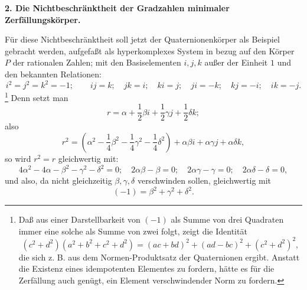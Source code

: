 
\begin{center}
\textbf{2. Die Nichtbeschränktheit der Gradzahlen minimaler\\
Zerfällungskörper.}
\end{center}

Für diese Nichtbeschränktheit soll jetzt der Quaternionenkörper als Beispiel gebracht werden, aufgefaßt als hyperkomplexes System in bezug auf den Körper $P$ der rationalen Zahlen; mit den Basiselementen $i,j,k$ außer der Einheit $1$ und den bekannten Relationen:
\[
 i^2=j^2=k^2=-1;\qquad ij=k;\quad jk=i;\quad ki=j;\quad ji=-k;\quad kj=-i;\quad ik=-j.
\]
\footnote{Daß aus einer Darstellbarkeit von $(-1)$ als Summe von drei Quadraten immer eine solche als Summe von zwei folgt, zeigt die Identität
\[
(c^2+d^2)(a^2+b^2+c^2+d^2)=(ac+bd)^2+(ad-bc)^2+(c^2+d^2)^2,
\]
die sich z. B. aus dem Normen-Produktsatz der Quaternionen ergibt. Anstatt die Existenz eines idempotenten Elementes zu fordern, hätte es für die Zerfällung auch genügt, ein Element verschwindender Norm zu fordern.} Denn setzt man
\[
        r=\alpha+\frac12\beta i+\frac12\gamma j+\frac12\delta k;
\]
also
\[
        r^2=\left(\alpha^2-\frac14\beta^2-\frac14\gamma^2-\frac14\delta^2\right)
          +\alpha\beta i+\alpha\gamma j+\alpha\delta k,
\]
so wird $r^2=r$ gleichwertig mit:
\[
4\alpha^2-4\alpha-\beta^2-\gamma^2-\delta^2=0;\quad
2\alpha\beta-\beta=0;\quad 2\alpha\gamma-\gamma=0;\quad 2\alpha\delta-\delta=0,
\]
und also, da nicht gleichzeitig $\beta,\gamma,\delta$ verschwinden sollen, gleichwertig mit
\[
        (-1)=\beta^2+\gamma^2+\delta^2.
\]

